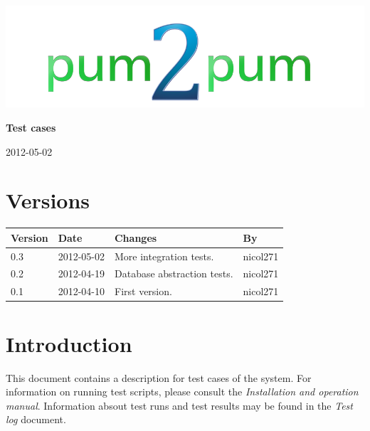 \documentclass[a4paper, 12pt, titlepage]{article}
\begin{document}
	
	\begin{titlepage}
		
		\includegraphics[scale=0.4]{logoNormal.png}
		
		\vspace{6cm}
		
		\begin{center}
			\Huge{\textbf{Test cases}} %
			
			\vspace{0.5cm}
			
			\huge{2012-05-02} %
		\end{center}
		
	\end{titlepage}
	
	\tableofcontents
	\newpage
	
	\section*{Versions}
	\begin{tabularx}{1\textwidth}{|l|l|X|l|}
		\hline
		\bf{Version} & \bf{Date} & \bf{Changes} & \bf{By} \\
		\hline
		0.3 & 2012-05-02 & More integration tests. & nicol271 \\
		\hline
		0.2 & 2012-04-19 & Database abstraction tests. & nicol271 \\
		\hline
		0.1 & 2012-04-10 & First version. & nicol271 \\
		\hline
	\end{tabularx}
	\newpage
	
	\section*{Introduction}
	This document contains a description for test cases of the system. For information on running test scripts, please consult the \emph{Installation and operation manual}. Information absout test runs and test results may be found in the \emph{Test log} document.
\end{document}
